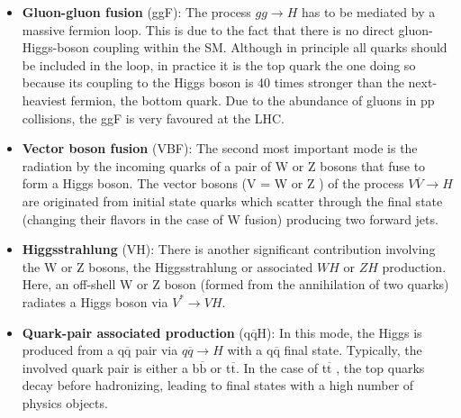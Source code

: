 

\begin{itemize}
    \item \textbf{Gluon-gluon fusion} (ggF): The process $gg \rightarrow H$ has to be mediated by a massive fermion loop. This is due to the fact that there is no direct gluon-Higgs-boson coupling within the SM. Although in principle all quarks should be included in the loop, in practice it is the top quark the one doing so because its coupling to the Higgs boson is 40 times stronger than the next-heaviest fermion, the bottom quark. Due to the abundance of gluons in pp collisions, the ggF is very favoured at the LHC.
    \item \textbf{Vector boson fusion} (VBF): The second most important mode is the radiation by the incoming quarks of a pair of W or Z bosons that fuse to form a Higgs boson. The vector bosons (V = W or Z ) of the process $V\overline{V} \rightarrow H$ are originated from initial state quarks which scatter through the final state (changing their flavors in the case of W fusion) producing two forward jets.
    \item \textbf{Higgsstrahlung} (VH): There is another significant contribution involving the W or Z bosons, the Higgsstrahlung or associated $W H$ or $Z H$ production. Here, an off-shell W or Z boson (formed from the annihilation of two quarks) radiates a Higgs boson via $V^* \rightarrow VH$.
    \item  \textbf{Quark-pair associated production} (q$\overline{\text{q}}$H): In this mode, the Higgs is produced from a q$\overline{\text{q}}$ pair via $q\overline{q} \rightarrow H$ with a q$\overline{\text{q}}$ final state. Typically, the involved quark pair is either a b$\overline{\text{b}}$ or t$\overline{\text{t}}$. In the case of t$\overline{\text{t}}$ , the top quarks decay before hadronizing, leading to final states with a high number of physics objects.
\end{itemize}

